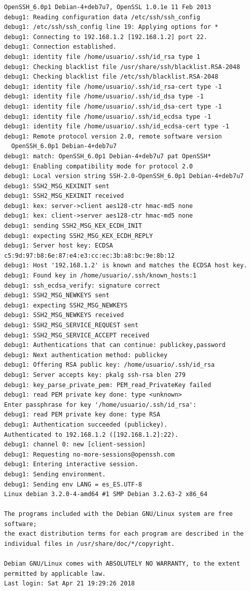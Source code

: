 \documentclass[11pt]{article}
\begin{document}
\begin{lstlisting}
OpenSSH_6.0p1 Debian-4+deb7u7, OpenSSL 1.0.1e 11 Feb 2013
debug1: Reading configuration data /etc/ssh/ssh_config
debug1: /etc/ssh/ssh_config line 19: Applying options for *
debug1: Connecting to 192.168.1.2 [192.168.1.2] port 22.
debug1: Connection established.
debug1: identity file /home/usuario/.ssh/id_rsa type 1
debug1: Checking blacklist file /usr/share/ssh/blacklist.RSA-2048
debug1: Checking blacklist file /etc/ssh/blacklist.RSA-2048
debug1: identity file /home/usuario/.ssh/id_rsa-cert type -1
debug1: identity file /home/usuario/.ssh/id_dsa type -1
debug1: identity file /home/usuario/.ssh/id_dsa-cert type -1
debug1: identity file /home/usuario/.ssh/id_ecdsa type -1
debug1: identity file /home/usuario/.ssh/id_ecdsa-cert type -1
debug1: Remote protocol version 2.0, remote software version
  OpenSSH_6.0p1 Debian-4+deb7u7
debug1: match: OpenSSH_6.0p1 Debian-4+deb7u7 pat OpenSSH*
debug1: Enabling compatibility mode for protocol 2.0
debug1: Local version string SSH-2.0-OpenSSH_6.0p1 Debian-4+deb7u7
debug1: SSH2_MSG_KEXINIT sent
debug1: SSH2_MSG_KEXINIT received
debug1: kex: server->client aes128-ctr hmac-md5 none
debug1: kex: client->server aes128-ctr hmac-md5 none
debug1: sending SSH2_MSG_KEX_ECDH_INIT
debug1: expecting SSH2_MSG_KEX_ECDH_REPLY
debug1: Server host key: ECDSA c5:9d:97:b8:6e:87:e4:e3:cc:ec:3b:a8:bc:9e:8b:12
debug1: Host '192.168.1.2' is known and matches the ECDSA host key.
debug1: Found key in /home/usuario/.ssh/known_hosts:1
debug1: ssh_ecdsa_verify: signature correct
debug1: SSH2_MSG_NEWKEYS sent
debug1: expecting SSH2_MSG_NEWKEYS
debug1: SSH2_MSG_NEWKEYS received
debug1: SSH2_MSG_SERVICE_REQUEST sent
debug1: SSH2_MSG_SERVICE_ACCEPT received
debug1: Authentications that can continue: publickey,password
debug1: Next authentication method: publickey
debug1: Offering RSA public key: /home/usuario/.ssh/id_rsa
debug1: Server accepts key: pkalg ssh-rsa blen 279
debug1: key_parse_private_pem: PEM_read_PrivateKey failed
debug1: read PEM private key done: type <unknown>
Enter passphrase for key '/home/usuario/.ssh/id_rsa':
debug1: read PEM private key done: type RSA
debug1: Authentication succeeded (publickey).
Authenticated to 192.168.1.2 ([192.168.1.2]:22).
debug1: channel 0: new [client-session]
debug1: Requesting no-more-sessions@openssh.com
debug1: Entering interactive session.
debug1: Sending environment.
debug1: Sending env LANG = es_ES.UTF-8
Linux debian 3.2.0-4-amd64 #1 SMP Debian 3.2.63-2 x86_64

The programs included with the Debian GNU/Linux system are free software;
the exact distribution terms for each program are described in the
individual files in /usr/share/doc/*/copyright.

Debian GNU/Linux comes with ABSOLUTELY NO WARRANTY, to the extent
permitted by applicable law.
Last login: Sat Apr 21 19:29:26 2018
\end{lstlisting}
\end{document}
